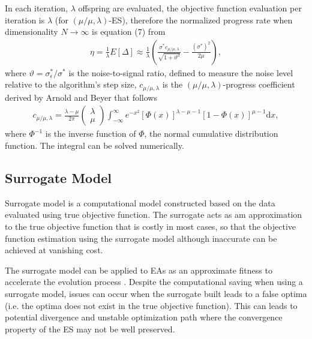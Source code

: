 In each iteration, $\lambda$ offspring are evaluated, the objective function evaluation per iteration is $\lambda$ (for $(\mu/\mu,\lambda)$-ES), therefore the normalized progress rate when dimensionality $N \rightarrow \infty$ is equation (7) from \cite{ARNOLD2001127} 
\begin{align}\label{eqn:eta_noise_sphere}{}
\eta = \frac{1}{\lambda}E[ \Delta] \approx \frac{1}{\lambda} \left( \frac{\sigma^* c_{\mu / \mu, \lambda}}{\sqrt {1+ \vartheta^2}} - \frac{(\sigma^*)^2}{2 \mu} \right),
\end{align}
where $\vartheta = \sigma_\epsilon^*/\sigma^*$ is the noise-to-signal ratio, defined to measure the noise level relative to the algorithm's step size, $c_{\mu/\mu,\lambda}$ is the $(\mu/\mu,\lambda)$-progress coefficient derived by Arnold and Beyer \cite{Arnold:2000:EMS:645825.669117} that follows
\begin{align}\label{eqn:c_mu_mu_lambda}
c_{\mu/\mu,\lambda}  = \frac{\lambda-\mu}{2 \pi} \begin{pmatrix} \lambda \\ \mu \end{pmatrix} \int_{-\infty}^{\infty} e^{-x^2}   \left [ \Phi(x)\right]^{\lambda-\mu-1}  \left[ 1- \Phi (x) \right]^{\mu-1}  \text{d} x,
\end{align}
where $\Phi^{-1}$ is the inverse function of $\Phi$, the normal cumulative distribution function. The integral can be solved numerically.  



\subsection{Surrogate Model} 

Surrogate model is a computational model constructed based on the data evaluated using true objective function. The surrogate acts as am approximation to the true objective function that is costly in most cases, so that the objective function estimation using the surrogate model although inaccurate can be achieved at vanishing cost. 

The surrogate model can be applied to EAs as an approximate fitness to accelerate the evolution process \cite{Ratle:1998:ACE:645824.668750}. Despite the computational saving when using a surrogate model, issues can occur when the surrogate built leads to a false optima (i.e. the optima does not exist in the true objective function). This can  leads to potential divergence and unstable optimization path where the convergence property of the ES may not be well preserved.   

